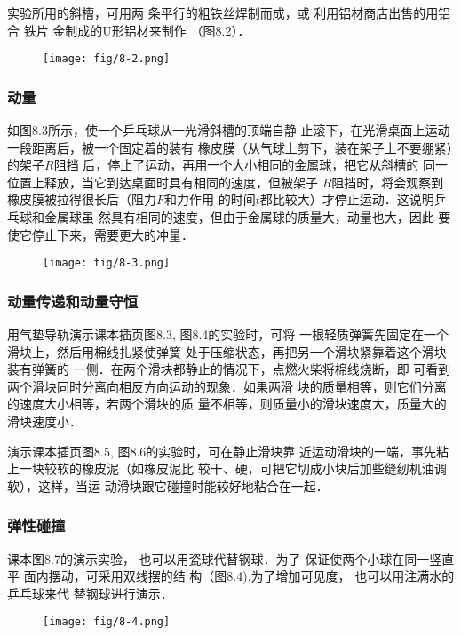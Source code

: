 实验所用的斜槽，可用两
条平行的粗铁丝焊制而成，或
利用铝材商店出售的用铝合
铁片
金制成的U形铝材来制作
（图8.2）．
\begin{figure}[htp]
    \centering
    \texttt{[image: fig/8-2.png]}
    \caption{}
\end{figure}

\subsubsection{动量}
如图8.3所示，使一个乒乓球从一光滑斜槽的顶端自静
止滚下，在光滑桌面上运动一段距离后，被一个固定着的装有
橡皮膜（从气球上剪下，装在架子上不要绷紧）的架子$R$阻挡
后，停止了运动，再用一个大小相同的金属球，把它从斜槽的
同一位置上释放，当它到达桌面时具有相同的速度，但被架子
$R$阻挡时，将会观察到橡皮膜被拉得很长后（阻力$F$和力作用
的时间$t$都比较大）才停止运动．这说明乒乓球和金属球虽
然具有相同的速度，但由于金属球的质量大，动量也大，因此
要使它停止下来，需要更大的冲量．
\begin{figure}[htp]
    \centering
    \texttt{[image: fig/8-3.png]}
    \caption{}
\end{figure}


\subsubsection{动量传递和动量守恒}
用气垫导轨演示课本插页图8.3, 图8.4的实验时，可将
一根轻质弹簧先固定在一个滑块上，然后用棉线扎紧使弹簧
处于压缩状态，再把另一个滑块紧靠着这个滑块装有弹簧的
一侧．在两个滑块都静止的情况下，点燃火柴将棉线烧断，即
可看到两个滑块同时分离向相反方向运动的现象．如果两滑
块的质量相等，则它们分离的速度大小相等，若两个滑块的质
量不相等，则质量小的滑块速度大，质量大的滑块速度小．

演示课本插页图8.5, 图8.6的实验时，可在静止滑块靠
近运动滑块的一端，事先粘上一块较软的橡皮泥（如橡皮泥比
较干、硬，可把它切成小块后加些缝纫机油调软），这样，当运
动滑块跟它碰撞时能较好地粘合在一起．

\subsubsection{弹性碰撞}
课本图8.7的演示实验，
也可以用瓷球代替钢球．为了
保证使两个小球在同一竖直平
面内摆动，可采用双线摆的结
构（图8.4).为了增加可见度，
也可以用注满水的乒乓球来代
替钢球进行演示．
\begin{figure}[htp]
    \centering
    \texttt{[image: fig/8-4.png]}
    \caption{}
\end{figure}


